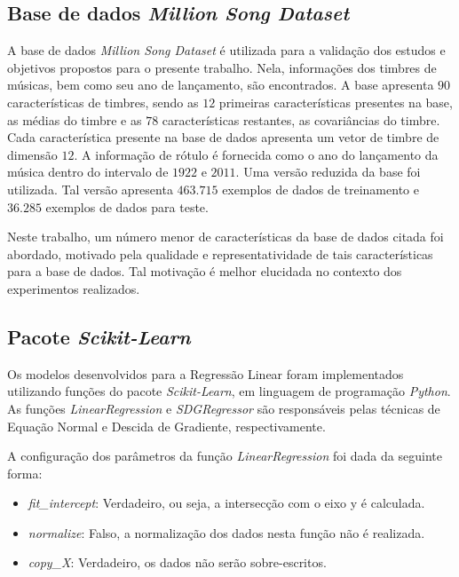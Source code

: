 \documentclass[conference]{IEEEtran}
\begin{document}
\subsection{Base de dados \textit{Million Song Dataset}} \label{sec:base}

A base de dados \emph{Million Song Dataset} é utilizada para a validação dos estudos e objetivos propostos para o presente trabalho. Nela, informações dos timbres de músicas, bem como seu ano de lançamento, são encontrados.  A base apresenta $90$ características de timbres, sendo as $12$ primeiras características presentes na base, as médias do timbre e as $78$ características restantes, as covariâncias do timbre. Cada característica presente na base de dados apresenta um vetor de timbre de dimensão $12$. A informação de rótulo é fornecida como o ano do lançamento da música dentro do intervalo de $1922$ e $2011$. Uma versão reduzida da base foi utilizada. Tal versão apresenta $463.715$ exemplos de dados de treinamento e $36.285$ exemplos de dados para teste.

Neste trabalho, um número menor de características da base de dados citada foi abordado, motivado pela qualidade e representatividade de tais características para a base de dados. Tal motivação é melhor elucidada no contexto dos experimentos realizados.

\subsection{Pacote \textit{Scikit-Learn}} \label{sec:base}

Os modelos desenvolvidos para a Regressão Linear foram implementados utilizando funções do pacote \emph{Scikit-Learn}, em linguagem de programação \emph{Python}. As funções \emph{LinearRegression} e \emph{SDGRegressor} são responsáveis pelas técnicas de Equação Normal\cite{b1} e Descida de Gradiente, respectivamente.

A configuração dos parâmetros da função \emph{LinearRegression} foi dada da seguinte forma:
\begin{itemize}
	\item \textit{fit\_intercept}: Verdadeiro, ou seja, a intersecção com o eixo y é calculada.
	\item \textit{normalize}: Falso, a normalização dos dados nesta função não é realizada.
	\item \textit{copy\_X}: Verdadeiro, os dados não serão sobre-escritos.
\end{itemize}
\end{document}

